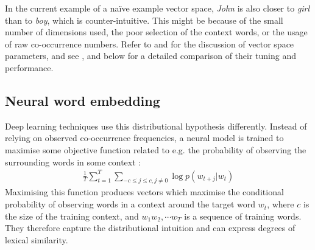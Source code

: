 In the current example of a na{\"i}ve example vector space, \textit{John} is also closer to \textit{girl} than to \textit{boy}, which is counter-intuitive. This might be because of the small number of dimensions used, the poor selection of the context words, or the usage of raw co-occurrence numbers. Refer to  and  for the discussion of vector space parameters, and see ,  and
%
 below
%
for a detailed comparison of their tuning and performance.

\subsection{Neural word embedding}
\label{sec:neural-embedding}

Deep learning techniques use this distributional hypothesis
differently. Instead of relying on observed co-occurrence frequencies,
a neural model is trained to maximise some objective function related
to e.g. the probability of observing the surrounding words in some
context \cite{mikolov2013distributed}:
%
\begin{align}
 \frac{1}{T}\sum^{T}_{t=1}\sum_{-c \leq j \leq c, j\neq0} \log p(w_{t+j}|w_t)
  \label{eq:objective-func}
\end{align}
%
\noindent
Maximising this function produces vectors which maximise the
conditional probability of observing words in a context around the
target word $w_t$, where $c$ is the size of the training context, and
$w_1 w_2, \cdots w_T$ is a sequence of training words. They therefore
capture the distributional intuition and can express degrees of
lexical similarity.



